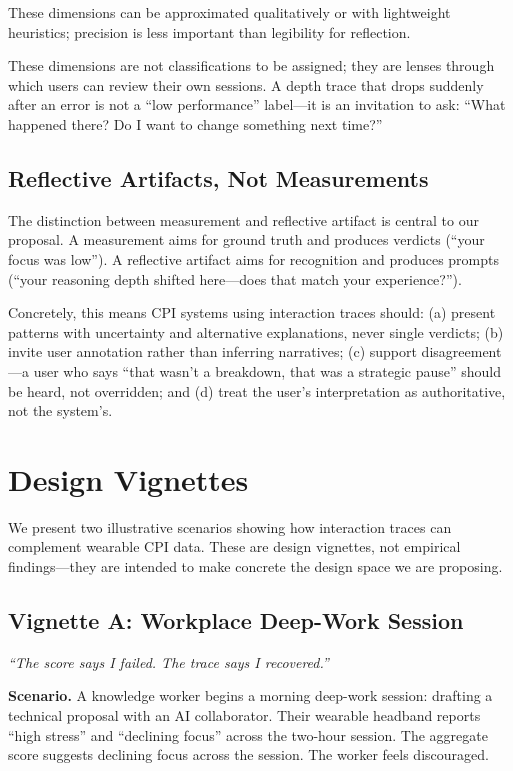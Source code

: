 These dimensions can be approximated qualitatively or with lightweight heuristics; precision is less important than legibility for reflection.

These dimensions are not classifications to be assigned; they are lenses through which users can review their own sessions. A depth trace that drops suddenly after an error is not a ``low performance'' label---it is an invitation to ask: ``What happened there? Do I want to change something next time?''

\subsection{Reflective Artifacts, Not Measurements}

The distinction between measurement and reflective artifact is central to our proposal. A measurement aims for ground truth and produces verdicts (``your focus was low''). A reflective artifact aims for recognition and produces prompts (``your reasoning depth shifted here---does that match your experience?'').

Concretely, this means CPI systems using interaction traces should: (a) present patterns with uncertainty and alternative explanations, never single verdicts; (b) invite user annotation rather than inferring narratives; (c) support disagreement---a user who says ``that wasn't a breakdown, that was a strategic pause'' should be heard, not overridden; and (d) treat the user's interpretation as authoritative, not the system's.

\section{Design Vignettes}

We present two illustrative scenarios showing how interaction traces can complement wearable CPI data. These are design vignettes, not empirical findings---they are intended to make concrete the design space we are proposing.

\subsection{Vignette A: Workplace Deep-Work Session}

\textit{``The score says I failed. The trace says I recovered.''}

\textbf{Scenario.} A knowledge worker begins a morning deep-work session: drafting a technical proposal with an AI collaborator. Their wearable headband reports ``high stress'' and ``declining focus'' across the two-hour session. The aggregate score suggests declining focus across the session. The worker feels discouraged.

